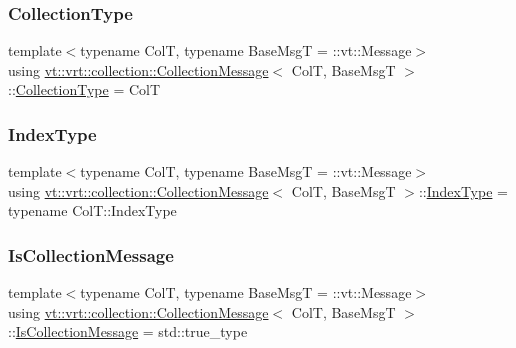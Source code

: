 \subsubsection{\texorpdfstring{Collection\+Type}{CollectionType}}
{\footnotesize\ttfamily template$<$typename ColT, typename Base\+MsgT = \+::vt\+::\+Message$>$ \\
using \hyperlink{structvt_1_1vrt_1_1collection_1_1_collection_message}{vt\+::vrt\+::collection\+::\+Collection\+Message}$<$ ColT, Base\+MsgT $>$\+::\hyperlink{structvt_1_1vrt_1_1collection_1_1_collection_message_afa8f7f5da0139ffa449144d8d35d7fe3}{Collection\+Type} =  ColT}

\mbox{\label{structvt_1_1vrt_1_1collection_1_1_collection_message_a324978c38e67d1bfa86c8db172e77594}} 
\subsubsection{\texorpdfstring{Index\+Type}{IndexType}}
{\footnotesize\ttfamily template$<$typename ColT, typename Base\+MsgT = \+::vt\+::\+Message$>$ \\
using \hyperlink{structvt_1_1vrt_1_1collection_1_1_collection_message}{vt\+::vrt\+::collection\+::\+Collection\+Message}$<$ ColT, Base\+MsgT $>$\+::\hyperlink{structvt_1_1vrt_1_1collection_1_1_collection_message_a324978c38e67d1bfa86c8db172e77594}{Index\+Type} =  typename Col\+T\+::\+Index\+Type}

\mbox{\label{structvt_1_1vrt_1_1collection_1_1_collection_message_a186fceb015a3415a482d99851432222b}} 
\subsubsection{\texorpdfstring{Is\+Collection\+Message}{IsCollectionMessage}}
{\footnotesize\ttfamily template$<$typename ColT, typename Base\+MsgT = \+::vt\+::\+Message$>$ \\
using \hyperlink{structvt_1_1vrt_1_1collection_1_1_collection_message}{vt\+::vrt\+::collection\+::\+Collection\+Message}$<$ ColT, Base\+MsgT $>$\+::\hyperlink{structvt_1_1vrt_1_1collection_1_1_collection_message_a186fceb015a3415a482d99851432222b}{Is\+Collection\+Message} =  std\+::true\+\_\+type}

